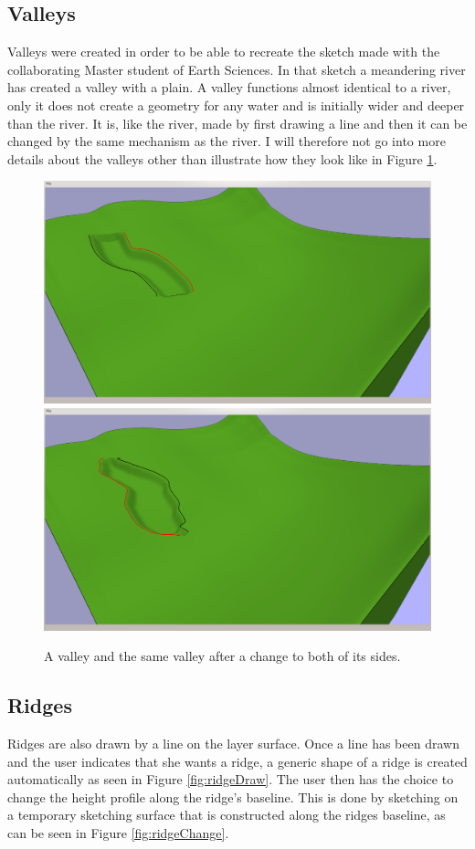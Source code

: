 \documentclass[a4paper,12pt]{report}
\begin{document}
\subsection{Valleys}
Valleys were created in order to be able to recreate the sketch made with the collaborating Master student of Earth Sciences. In that sketch a meandering river has created a valley with a plain.
A valley functions almost identical to a river, only it does not create a geometry for any water and is initially wider and deeper than the river. It is, like the river, made by first drawing a line and then it can be changed by the same mechanism as the river. I will therefore not go into more details about the valleys other than illustrate how they look like in Figure \ref{fig:valley}.
\begin{figure}
\includegraphics[trim = 10mm 80mm 200mm 30mm, clip,width=.5\linewidth]{thesis/results/valleyMade.png}
\includegraphics[trim = 10mm 80mm 200mm 30mm, clip,width=.5\linewidth]{thesis/results/valleyChanged.png}
 \caption{A valley and the same valley after a change to both of its sides. }
 \label{fig:valley}
\end{figure}

\subsection{Ridges}

Ridges are also drawn by a line on the layer surface. Once a line has been drawn and the user indicates that she wants a ridge, a generic shape of a ridge is created automatically as seen in Figure \ref{fig:ridgeDraw}. The user then has the choice to change the height profile along the ridge's baseline. This is done by sketching on a temporary sketching surface that is constructed along the ridges baseline, as can be seen in Figure \ref{fig:ridgeChange}.
\end{document}
